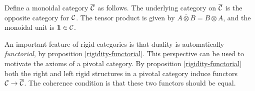 \begin{defn} Define a monoidal category $\overline{{\mathcal C}}$ as follows. The underlying category on $\overline{{\mathcal C}}$ is the opposite category for ${\mathcal C}$. The tensor product is given by $A\overline{\otimes} B = B\otimes A$, and the monoidal unit is ${\mathbf 1} \in {\mathcal C}$. 
\end{defn}

\begin{rem} An important feature of rigid categories is that duality is automatically {\em functorial}, by proposition \ref{rigidity-functorial}. This perspective can be used to motivate the axioms of a pivotal category. By proposition \ref{rigidity-functorial} both the right and left rigid structures in a pivotal category induce functors ${\mathcal C}\to \overline{{\mathcal C}}$. The coherence condition is that these two functors should be equal.
\end{rem}

